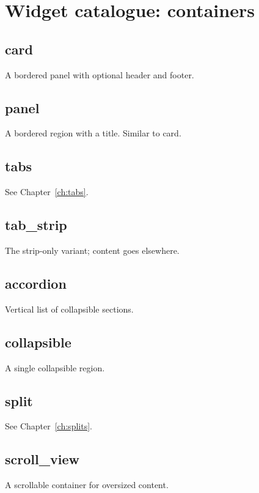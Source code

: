 \chapter{Widget catalogue: containers}
\label{ch:catalogue_containers}

\section{card}

A bordered panel with optional header and footer.

\section{panel}

A bordered region with a title. Similar to card.

\section{tabs}

See Chapter~\ref{ch:tabs}.

\section{tab\_strip}

The strip-only variant; content goes elsewhere.

\section{accordion}

Vertical list of collapsible sections.

\section{collapsible}

A single collapsible region.

\section{split}

See Chapter~\ref{ch:splits}.

\section{scroll\_view}

A scrollable container for oversized content.

